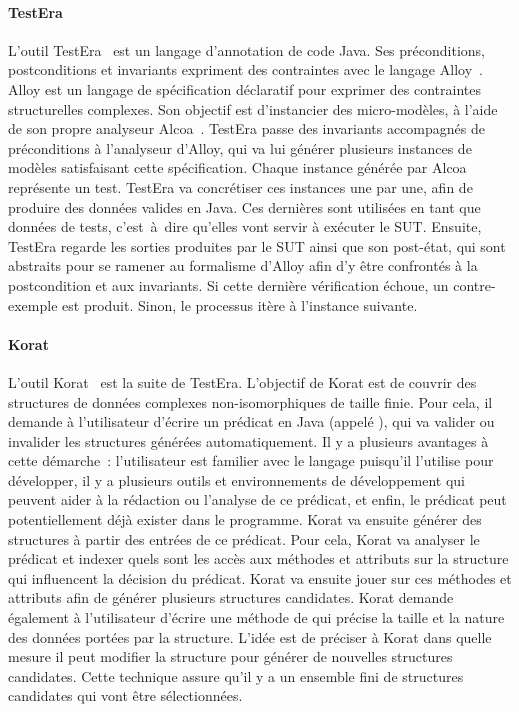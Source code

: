 \paragraph{TestEra} L'outil TestEra~ est un langage
d'annotation de code Java. Ses préconditions, postconditions et invariants
expriment des contraintes avec le langage Alloy~. Alloy est un
langage de spécification déclaratif pour exprimer des contraintes structurelles
complexes. Son objectif est d'instancier des micro-modèles, à l'aide de son
propre analyseur Alcoa~. TestEra passe des invariants
accompagnés de préconditions à l'analyseur d'Alloy, qui va lui générer plusieurs
instances de modèles satisfaisant cette spécification. Chaque instance générée
par Alcoa représente un test. TestEra va concrétiser ces instances une par une,
afin de produire des données valides en Java. Ces dernières sont utilisées en
tant que données de tests, c'est~à~dire qu'elles vont servir à exécuter le SUT.
Ensuite, TestEra regarde les sorties produites par le SUT ainsi que son
post-état, qui sont abstraits pour se ramener au formalisme d'Alloy afin d'y
être confrontés à la postcondition et aux invariants. Si cette dernière
vérification échoue, un contre-exemple est produit. Sinon, le processus itère à
l'instance suivante.

\paragraph{Korat} L'outil Korat~ est la suite de TestEra.
L'objectif de Korat est de couvrir des structures de données
complexes non-isomorphiques de taille finie. Pour cela, il demande à
l'utilisateur d'écrire un prédicat en Java (appelé ), qui va valider
ou invalider les structures générées automatiquement. Il y a plusieurs avantages
à cette démarche~: l'utilisateur est familier avec le langage puisqu'il
l'utilise pour développer, il y a plusieurs outils et environnements de
développement qui peuvent aider à la rédaction ou l'analyse de ce prédicat, et
enfin, le prédicat peut potentiellement déjà exister dans le programme. Korat va
ensuite générer des structures à partir des entrées de ce prédicat. Pour cela,
Korat va analyser le prédicat et indexer quels sont les accès aux méthodes et
attributs sur la structure qui influencent la décision du prédicat. Korat va
ensuite jouer sur ces méthodes et attributs afin de générer plusieurs structures
candidates. Korat demande également à l'utilisateur d'écrire une méthode de
 qui précise la taille et la nature des données portées
par la structure. L'idée est de préciser à Korat dans quelle mesure il peut
modifier la structure pour générer de nouvelles structures candidates. Cette
technique assure qu'il y a un ensemble fini de structures candidates qui vont
être sélectionnées.

